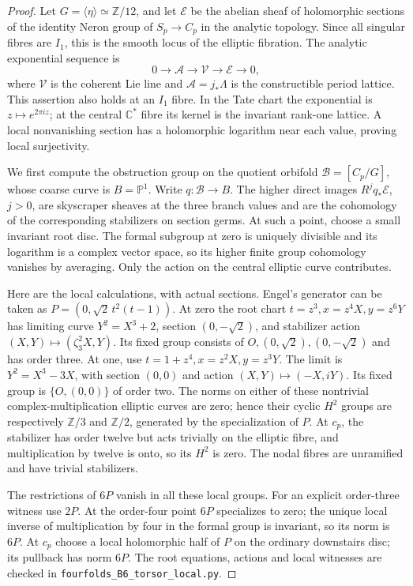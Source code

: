 \begin{proof}
Let $G=\langle\eta\rangle\simeq\mathbb Z/12$, and let
$\mathcal E$ be the abelian sheaf of holomorphic sections of
the identity Neron group of $S_p\to C_p$ in the analytic
topology. Since all singular fibres are $I_1$, this is the
smooth locus of the elliptic fibration. The analytic
exponential sequence is
\[
 0\longrightarrow\mathcal A\longrightarrow\mathcal V
   \longrightarrow\mathcal E\longrightarrow0,
 \tag{B.6.23}
\]
where $\mathcal V$ is the coherent Lie line and
$\mathcal A=j_*\Lambda$ is the constructible period lattice.
This assertion also holds at an $I_1$ fibre. In the Tate chart
the exponential is $z\mapsto e^{2\pi iz}$; at the central
$\mathbb C^*$ fibre its kernel is the invariant rank-one
lattice. A local nonvanishing section has a holomorphic
logarithm near each value, proving local surjectivity.

We first compute the obstruction group on the quotient
orbifold $\mathcal B=[C_p/G]$, whose coarse curve is
$B=\mathbb P^1$. Write $q:\mathcal B\to B$.
The higher direct images $R^jq_*\mathcal E$, $j>0$, are
skyscraper sheaves at the three branch values and are the
cohomology of the corresponding stabilizers on section germs.
At such a point, choose a small invariant root disc. The
formal subgroup at zero is uniquely divisible and its
logarithm is a complex vector space, so its higher finite
group cohomology vanishes by averaging. Only the action on
the central elliptic curve contributes.

Here are the local calculations, with actual sections.
Engel's generator can be taken as
$P=(0,\sqrt{2}\,t^2(t-1))$. At zero the root chart
$t=z^3,x=z^4X,y=z^6Y$ has limiting curve
$Y^2=X^3+2$, section $(0,-\sqrt2)$, and stabilizer action
$(X,Y)\mapsto(\zeta_3^2X,Y)$. Its fixed group consists of
$O,(0,\sqrt2),(0,-\sqrt2)$ and has order three.
At one, use $t=1+z^4,x=z^2X,y=z^3Y$. The limit is
$Y^2=X^3-3X$, with section $(0,0)$ and action
$(X,Y)\mapsto(-X,iY)$. Its fixed group is
$\{O,(0,0)\}$ of order two. The norms on either of these
nontrivial complex-multiplication elliptic curves are zero;
hence their cyclic $H^2$ groups are respectively
$\mathbb Z/3$ and $\mathbb Z/2$, generated by the
specialization of $P$. At $c_p$, the stabilizer has order
twelve but acts trivially on the elliptic fibre, and
multiplication by twelve is onto, so its $H^2$ is zero.
The nodal fibres are unramified and have trivial stabilizers.

The restrictions of $6P$ vanish in all these local groups.
For an explicit order-three witness use $2P$.
At the order-four point $6P$ specializes to zero; the unique
local inverse of multiplication by four in the formal group
is invariant, so its norm is $6P$. At $c_p$ choose a local
holomorphic half of $P$ on the ordinary downstairs disc;
its pullback has norm $6P$. The root equations, actions and
local witnesses are checked in
\texttt{fourfolds\_B6\_torsor\_local.py}.


\end{proof}
